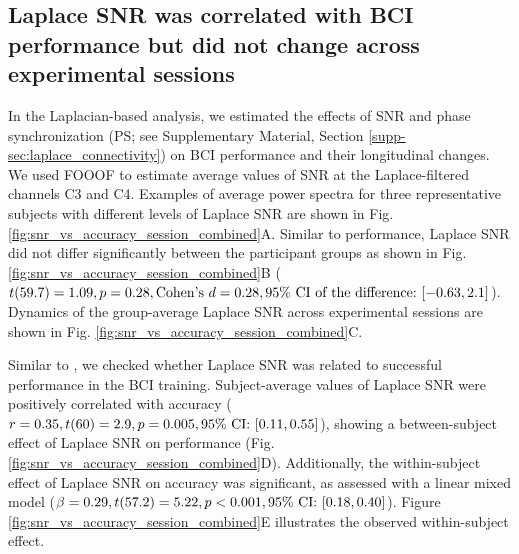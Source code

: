 \subsection{Laplace SNR was correlated with BCI performance but did not change across experimental sessions}

In the Laplacian-based analysis, we estimated the effects of SNR and phase synchronization (PS; see Supplementary Material, Section \ref{supp-sec:laplace_connectivity}) on BCI performance and their longitudinal changes. We used FOOOF to estimate average values of SNR at the Laplace-filtered channels C3 and C4. Examples of average power spectra for three representative subjects with different levels of Laplace SNR are shown in Fig. \ref{fig:snr_vs_accuracy_session_combined}A. Similar to performance, Laplace SNR did not differ significantly between the participant groups as shown in Fig. \ref{fig:snr_vs_accuracy_session_combined}B ($t(59.7) = 1.09, p = 0.28, \text{Cohen's}~d = 0.28, 95\%~\text{CI of the difference:}~ [-0.63, 2.1]$). Dynamics of the group-average Laplace SNR across experimental sessions are shown in Fig. \ref{fig:snr_vs_accuracy_session_combined}C.

\medskip

Similar to \citep{Blankertz2010}, we checked whether Laplace SNR was related to successful performance in the BCI training. Subject-average values of Laplace SNR were positively correlated with accuracy ($r=0.35, t(60) = 2.9, p = 0.005, 95\%~\text{CI:}~ [0.11, 0.55]$), showing a between-subject effect of Laplace SNR on performance (Fig. \ref{fig:snr_vs_accuracy_session_combined}D). Additionally, the within-subject effect of Laplace SNR on accuracy was significant, as assessed with a linear mixed model ($\beta = 0.29, t(57.2) = 5.22, p < 0.001, 95\%~\text{CI:}~ [0.18, 0.40]$). Figure \ref{fig:snr_vs_accuracy_session_combined}E illustrates the observed within-subject effect.

\medskip

